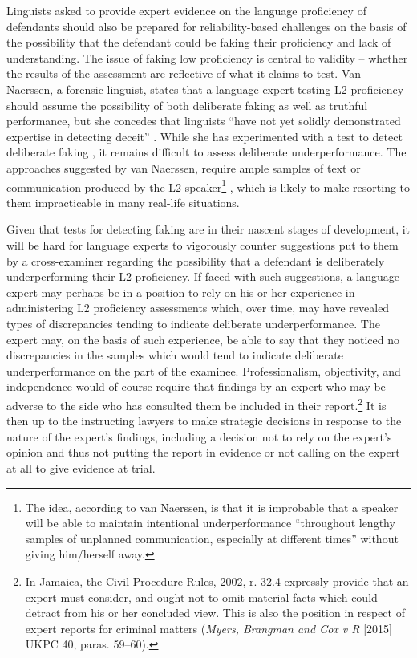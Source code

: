 \documentclass[output=paper,colorlinks,citecolor=brown]{langscibook}
\begin{document}
Linguists asked to provide expert evidence on the language proficiency of defendants should also be prepared for reliability-based challenges on the basis of the possibility that the defendant could be faking their proficiency and lack of understanding. The issue of faking low proficiency is central to validity – whether the results of the assessment are reflective of what it claims to test. Van Naerssen, a forensic linguist, states that a language expert testing L2 proficiency should assume the possibility of both deliberate faking as well as truthful performance, but she concedes that linguists “have not yet solidly demonstrated expertise in detecting deceit” \citep[1547--1548]{vanNaerssen2013}. While she has experimented with a test to detect deliberate faking \citep{vanNaerssen2011}, it remains difficult to assess deliberate underperformance. The approaches suggested by van Naerssen, require ample samples of text or communication produced by the L2 speaker\footnote{The idea, according to van Naerssen, is that it is improbable that a speaker will be able to maintain intentional underperformance “throughout lengthy samples of unplanned communication, especially at different times” \citep[1548]{vanNaerssen2013} without giving him/herself away.} \citep[1548--1549]{vanNaerssen2013}, which is likely to make resorting to them impracticable in many real-life situations.

Given that tests for detecting faking are in their nascent stages of development, it will be hard for language experts to vigorously counter suggestions put to them by a cross-examiner regarding the possibility that a defendant is deliberately underperforming their L2 proficiency. If faced with such suggestions, a language expert may perhaps be in a position to rely on his or her experience in administering L2 proficiency assessments which, over time, may have revealed types of discrepancies tending to indicate deliberate underperformance. The expert may, on the basis of such experience, be able to say that they noticed no discrepancies in the samples which would tend to indicate deliberate underperformance on the part of the examinee. Professionalism, objectivity, and independence would of course require that findings by an expert who may be adverse to the side who has consulted them be included in their report.\footnote{In Jamaica, the Civil Procedure Rules, 2002, r. 32.4 expressly provide that an expert must consider, and ought not to omit material facts which could detract from his or her concluded view. This is also the position in respect of expert reports for criminal matters (\emph{Myers, Brangman and Cox v R} [2015] UKPC 40, paras. 59--60).} It is then up to the instructing lawyers to make strategic decisions in response to the nature of the expert’s findings, including a decision not to rely on the expert’s opinion and thus not putting the report in evidence or not calling on the expert at all to give evidence at trial.
\end{document}
